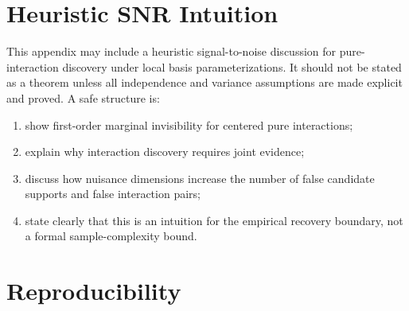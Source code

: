 \documentclass[11pt]{article}
\begin{document}
\section{Heuristic SNR Intuition}

This appendix may include a heuristic signal-to-noise discussion for pure-interaction discovery under local basis parameterizations. It should not be stated as a theorem unless all independence and variance assumptions are made explicit and proved. A safe structure is:
\begin{enumerate}
    \item show first-order marginal invisibility for centered pure interactions;
    \item explain why interaction discovery requires joint evidence;
    \item discuss how nuisance dimensions increase the number of false candidate supports and false interaction pairs;
    \item state clearly that this is an intuition for the empirical recovery boundary, not a formal sample-complexity bound.
\end{enumerate}

\section{Reproducibility}
\end{document}
